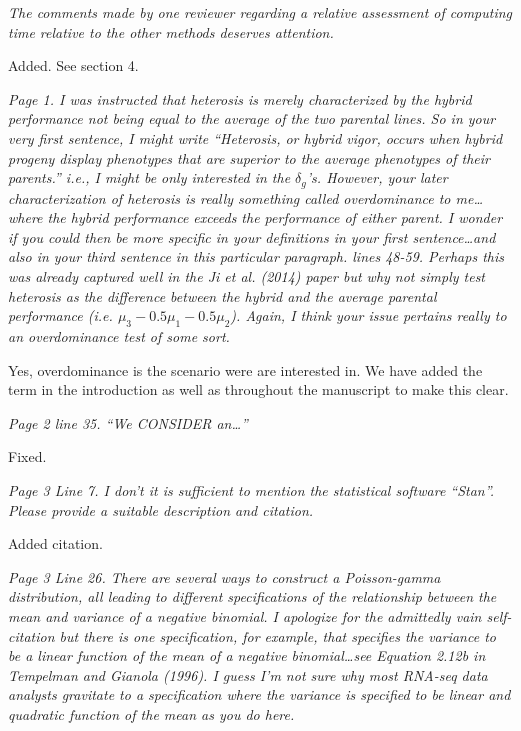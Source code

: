\documentclass{article}
\newcommand{\comment}[1]{\textit{#1}}
\newcommand{\response}[1]{#1}
\begin{document}
\comment{The comments made by one reviewer regarding a relative assessment of computing time relative to the other methods deserves attention.}

\response{Added. See section 4.}

\comment{Page 1.  I was instructed that heterosis is merely characterized by the hybrid performance not being equal to the average of the two parental lines.  So in your very first sentence, I might write “Heterosis, or hybrid vigor, occurs when hybrid progeny display phenotypes that are superior to the average phenotypes of their parents.” i.e., I might be only interested in the $\delta_g$’s. However, your later characterization of heterosis is really something called overdominance to me…where the hybrid performance exceeds the performance of either parent.  I wonder if you could then be more specific in your definitions in your first sentence…and also in your third sentence in this particular paragraph. lines 48-59.  Perhaps this was already captured well in the Ji et al. (2014) paper but why not simply test heterosis as the difference between the hybrid and the average parental performance (i.e. $\mu_3 - 0.5 \mu_1 - 0.5 \mu_2$).  Again, I think your issue pertains really to an overdominance test of some sort.}

\response{Yes, overdominance is the scenario were are interested in. We have added the term in the introduction as well as throughout the manuscript to make this clear.}

\comment{Page 2 line 35.  “We CONSIDER an…”}

\response{Fixed.}

\comment{Page 3 Line 7.  I don’t it is sufficient to mention the statistical software “Stan”.  Please provide a suitable description and citation.}

\response{Added citation.}

\comment{Page 3 Line 26.  There are several ways to construct a Poisson-gamma distribution, all leading to different specifications of the relationship between the mean and variance of a negative binomial.  I apologize for the admittedly vain self-citation but there is one specification, for example, that specifies the variance to be a linear function of the mean of a negative binomial…see Equation 2.12b in  Tempelman and Gianola (1996).  I guess I’m not sure why most RNA-seq data analysts gravitate to a specification where the variance is specified to be linear and quadratic function of the mean as you do here.}
\end{document}
